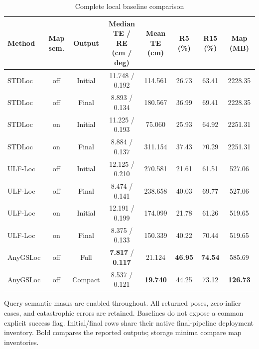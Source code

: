 \begin{table}[tp]
\centering
\footnotesize
\setlength{\tabcolsep}{4pt}
\renewcommand{\arraystretch}{1.12}
\caption{Complete local baseline comparison}
\label{tab:s_baselines}
\begin{tabular}{lccccccc}
\toprule
Method & Map sem. & Output & \shortstack{Median TE / RE\\(cm / deg)} & \shortstack{Mean TE\\(cm)} & R5 (\%) & R15 (\%) & Map (MB) \\
\midrule
STDLoc & off & Initial & 11.748 / 0.192 & 114.561 & 26.73 & 63.41 & 2228.35 \\
STDLoc & off & Final & 8.893 / 0.134 & 180.567 & 36.99 & 69.41 & 2228.35 \\
STDLoc & on & Initial & 11.225 / 0.193 & 75.060 & 25.93 & 64.92 & 2251.31 \\
STDLoc & on & Final & 8.884 / 0.137 & 311.154 & 37.43 & 70.29 & 2251.31 \\
ULF-Loc & off & Initial & 12.125 / 0.210 & 270.581 & 21.61 & 61.51 & 527.06 \\
ULF-Loc & off & Final & 8.474 / 0.141 & 238.658 & 40.03 & 69.77 & 527.06 \\
ULF-Loc & on & Initial & 12.191 / 0.199 & 174.099 & 21.78 & 61.26 & 519.65 \\
ULF-Loc & on & Final & 8.375 / 0.133 & 150.339 & 40.22 & 70.44 & 519.65 \\
AnyGSLoc & off & Full & \textbf{7.817} / \textbf{0.117} & 21.124 & \textbf{46.95} & \textbf{74.54} & 585.69 \\
AnyGSLoc & off & Compact & 8.537 / 0.121 & \textbf{19.740} & 44.25 & 73.12 & \textbf{126.73} \\
\bottomrule
\end{tabular}
\par\smallskip\begin{minipage}{0.98\linewidth}\footnotesize Query semantic masks are enabled throughout. All returned poses, zero-inlier cases, and catastrophic errors are retained. Baselines do not expose a common explicit success flag. Initial/final rows share their native final-pipeline deployment inventory. Bold compares the reported outputs; storage minima compare map inventories.\end{minipage}
\end{table}
